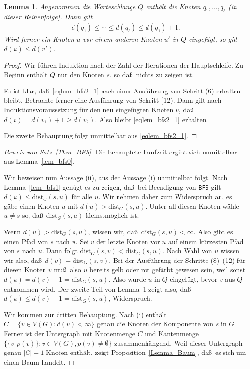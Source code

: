 \documentclass[10pt,reqno]{amsart}
\numberwithin{equation}{section}
\newtheorem{lemma}[definition]{Lemma}
\newcommand\dist{\mathrm{dist}}
\newcommand\Lem{Lemma}
\newcommand\Prop{Proposition}
\newcommand\Thm{Satz}
\begin{document}
\begin{lemma}\label{lem_bfs2}
	Angenommen die Warteschlange $Q$ enth\"alt die Knoten $q_1,\ldots,q_\ell$ (in dieser Reihenfolge).
	Dann gilt 
	\begin{align}\label{eqlem_bfs2_1}
	d(q_1)\leq\cdots\leq d(q_\ell)\leq d(q_1)+1.
	\end{align}
	Wird ferner ein Knoten $u$ vor einem anderen Knoten $u'$ in $Q$ eingef\"ugt, so gilt $d(u)\leq d(u')$.
\end{lemma}
\begin{proof}
	Wir f\"uhren Induktion nach der Zahl der Iterationen der Hauptschleife.
	Zu Beginn enth\"alt $Q$ nur den Knoten $s$, so da\ss\ nichts zu zeigen ist.

	Es ist klar, da\ss\ \eqref{eqlem_bfs2_1} nach einer Ausf\"uhrung von Schritt (6) erhalten bleibt.
	Betrachte ferner eine Ausf\"uhrung von Schritt (12).
	Dann gilt nach Induktionsvoraussetzung f\"ur den neu eingef\"ugten Knoten $v$, da\ss\ $d(v)=d(v_1)+1\geq d(v_2)$.
	Also bleibt \eqref{eqlem_bfs2_1} erhalten.

	Die zweite Behauptung folgt unmittelbar aus \eqref{eqlem_bfs2_1}.
\end{proof}

\begin{proof}[Beweis von \Thm~\ref{Thm_BFS}]
	Die behauptete Laufzeit ergibt sich unmittelbar aus \Lem~\ref{lem_bfs0}.

	Wir beweisen nun Aussage (ii), aus der Aussage (i) unmittelbar folgt.
Nach \Lem~\ref{lem_bfs1} gen\"ugt es zu zeigen, da\ss\ bei Beendigung von {\tt BFS} gilt $d(u)\leq\dist_G(s,u)$ f\"ur alle $u$.
	Wir nehmen daher zum Widerspruch an, es g\"abe einen Knoten $u$ mit $d(u)>\dist_G(s,u)$.
	Unter all diesen Knoten w\"ahle $u\neq s$ so, da\ss\ $\dist_G(s,u)$ kleinstm\"oglich ist.

	Wenn $d(u)>\dist_G(s,u)$, wissen wir, da\ss\ $\dist_G(s,u)<\infty$.
	Also gibt es einen Pfad von $s$ nach $u$.
	Sei $v$ der letzte Knoten vor $u$ auf einem k\"urzesten Pfad von $s$ nach $u$.
	Dann folgt $\dist_G(s,v)<\dist_G(s,u)$.
	Nach Wahl von $u$ wissen wir also, da\ss\ $d(v)=\dist_G(s,v)$.
	Bei der Ausf\"uhrung der Schritte (8)--(12) f\"ur diesen Knoten $v$ mu\ss\ also $u$ bereits gelb oder rot gef\"arbt gewesen sein, weil sonst $d(u)=d(v)+1=\dist_G(s,u)$.
	Also wurde $u$ in $Q$ eingef\"ugt, bevor $v$ aus $Q$ entnommen wird.
	Der zweite Teil von \Lem~\ref{lem_bfs2} zeigt also, da\ss\ $d(u)\leq d(v)+1=\dist_G(s,u)$, Widerspruch.

	Wir kommen zur dritten Behauptung.
	Nach (i) enth\"alt $C=\{v\in V(G):d(v)<\infty\}$ genau die Knoten der Komponente von $s$ in $G$.
	Ferner ist der Untergraph mit Knotenmenge $C$ und Kantenmenge $\{\{v,p(v)\}:v\in V(G),p(v)\neq\emptyset\}$ zusammenh\"angend.
	Weil dieser Untergraph genau $|C|-1$ Knoten enth\"alt, zeigt \Prop~\ref{Lemma_Baum}, da\ss\ es sich um einen Baum handelt.
\end{proof}
\end{document}

